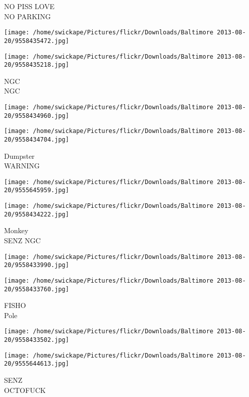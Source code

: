 \documentclass[10pt,letterpaper]{article}
\begin{document}
NO PISS LOVE\\
NO PARKING\\
\pagebreak

\texttt{[image: /home/swickape/Pictures/flickr/Downloads/Baltimore 2013-08-20/9558435472.jpg]}

\vspace{0.25in}
\texttt{[image: /home/swickape/Pictures/flickr/Downloads/Baltimore 2013-08-20/9558435218.jpg]}

NGC\\
NGC\\
\pagebreak

\texttt{[image: /home/swickape/Pictures/flickr/Downloads/Baltimore 2013-08-20/9558434960.jpg]}

\vspace{0.25in}
\texttt{[image: /home/swickape/Pictures/flickr/Downloads/Baltimore 2013-08-20/9558434704.jpg]}

Dumpster\\
WARNING\\
\pagebreak

\texttt{[image: /home/swickape/Pictures/flickr/Downloads/Baltimore 2013-08-20/9555645959.jpg]}

\vspace{0.25in}
\texttt{[image: /home/swickape/Pictures/flickr/Downloads/Baltimore 2013-08-20/9558434222.jpg]}

Monkey\\
SENZ NGC\\
\pagebreak

\texttt{[image: /home/swickape/Pictures/flickr/Downloads/Baltimore 2013-08-20/9558433990.jpg]}

\vspace{0.25in}
\texttt{[image: /home/swickape/Pictures/flickr/Downloads/Baltimore 2013-08-20/9558433760.jpg]}

FISHO\\
Pole\\
\pagebreak

\texttt{[image: /home/swickape/Pictures/flickr/Downloads/Baltimore 2013-08-20/9558433502.jpg]}

\vspace{0.25in}
\texttt{[image: /home/swickape/Pictures/flickr/Downloads/Baltimore 2013-08-20/9555644613.jpg]}

SENZ\\
OCTOFUCK\\
\pagebreak
\end{document}
